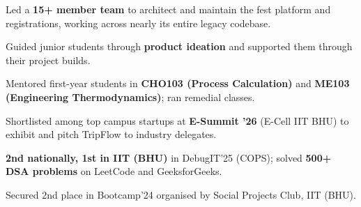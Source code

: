 \documentclass[10pt]{article}
\begin{document}
\begin{rkbody}
\begin{rkitems}
  \item Led a \textbf{15+ member team} to architect and maintain the fest platform and registrations, working across nearly its entire legacy codebase.
\end{rkitems}
\begin{rkitems}
  \item Guided junior students through \textbf{product ideation} and supported them through their project builds.
\end{rkitems}
\begin{rkitems}
  \item Mentored first-year students in \textbf{CHO103 (Process Calculation)} and \textbf{ME103 (Engineering Thermodynamics)}; ran remedial classes.
\end{rkitems}

\begin{rkitems}
  \item Shortlisted among top campus startups at \textbf{E-Summit '26} (E-Cell IIT BHU) to exhibit and pitch TripFlow to industry delegates.
  \item \textbf{2nd nationally, 1st in IIT (BHU)} in DebugIT'25 (COPS); solved \textbf{500+ DSA problems} on LeetCode and GeeksforGeeks.
  \item Secured 2nd place in Bootcamp'24 organised by Social Projects Club, IIT (BHU).
\end{rkitems}

\end{rkbody}
\end{document}
